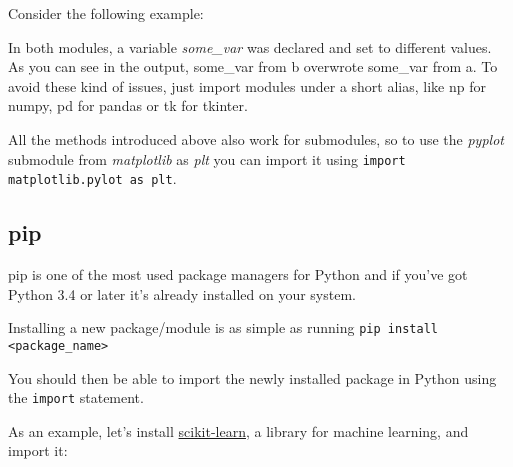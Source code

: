       Consider the following example:

      In both modules, a variable \textit{some\_var} was declared and set to different values.
      As you can see in the output, some\_var from b overwrote some\_var from a.
      To avoid these kind of issues, just import modules under a short alias, like
      np for numpy, pd for pandas or tk for tkinter.

      All the methods introduced above also work for submodules, so to use the \textit{pyplot}
      submodule from \textit{matplotlib} as \textit{plt} you can import it using
      \texttt{import matplotlib.pylot as plt}.

  \subsection{pip}
    pip is one of the most used package managers for Python and if you've got Python 3.4 or later
    it's already installed on your system.

    Installing a new package/module is as simple as running 
    \texttt{pip install <package_name>}

    You should then be able to import the newly installed package in Python using the
    \texttt{import} statement.

    As an example, let's install \href{https://scikit-learn.org/}{scikit-learn}, a library
    for machine learning, and import it:

    
